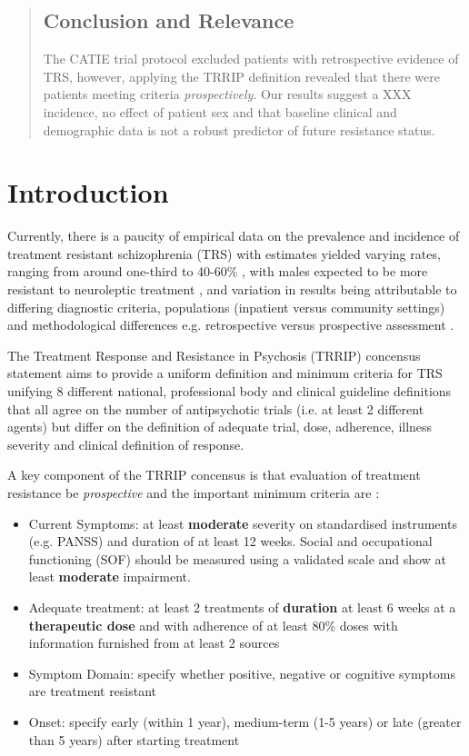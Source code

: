 \documentclass[a4paper,nobib]{article}
\begin{document}
\begin{abstract}
\subsection*{Conclusion and Relevance}
The CATIE trial protocol excluded patients with retrospective evidence of TRS, however, applying the TRRIP definition revealed that there were patients meeting criteria \emph{prospectively}.  Our results suggest a XXX incidence, no effect of patient sex and that baseline clinical and demographic data is not a robust predictor of future resistance status. 
\end{abstract}

\section{Introduction}
Currently, there is a paucity of empirical data on the prevalence and incidence of treatment resistant schizophrenia (TRS) with estimates yielded varying rates, ranging from around one-third \citep{Lehman2004,elkis2007treatment} to 40-60\% \citep{juarez1995restricting,essock1996clozapine,meltzer2001treatment}, with males expected to be more resistant to neuroleptic treatment \citep{szymanski1995gender}, and variation in results being attributable to differing diagnostic criteria, populations (inpatient versus community settings) and methodological differences e.g. retrospective versus prospective assessment \citep{dammak2013}. 

The Treatment Response and Resistance in Psychosis (TRRIP) \cite{Howes2017} concensus statement aims to provide a uniform definition and minimum criteria for TRS unifying 8 different national, professional body and clinical guideline definitions that all agree on the number of antipsychotic trials (i.e. at least 2 different agents) but differ on the definition of adequate trial, dose, adherence, illness severity and clinical definition of response.   

A key component of the TRRIP concensus is that evaluation of treatment resistance be \emph{prospective} and the important minimum criteria are \citep{Howes2017}:
\begin{itemize}
	\item Current Symptoms: at least \textbf{moderate} severity on standardised instruments (e.g. PANSS) and duration of at least 12 weeks.  Social and occupational functioning (SOF) should be measured using a validated scale and show at least \textbf{moderate} impairment.
	\item Adequate treatment: at least 2 treatments of \textbf{duration} at least 6 weeks at a \textbf{therapeutic dose} and with adherence of at least 80\% doses with information furnished from at least 2 sources
	\item Symptom Domain: specify whether positive, negative or cognitive symptoms are treatment resistant
	\item Onset: specify early (within 1 year), medium-term (1-5 years) or late (greater than 5 years) after starting treatment 
\end{itemize}
\end{document}
